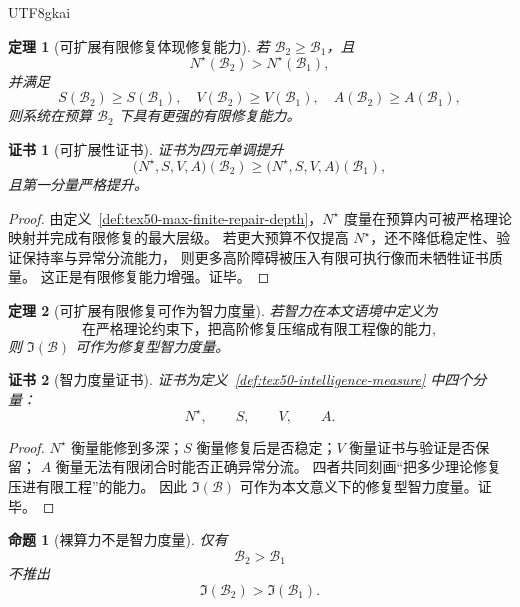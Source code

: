\documentclass[12pt]{article}
\newtheorem{theorem}{定理}[section]
\newtheorem{proposition}{命题}[section]
\newtheorem{Certificate}{证书}[section]
\begin{document}
\begin{CJK*}{UTF8}{gkai}
\begin{theorem}[可扩展有限修复体现修复能力]
\label{thm:tex50-scalable-finite-repair}
若 $\mathcal B_2\ge\mathcal B_1$，且
\[
  N^\star(\mathcal B_2)>N^\star(\mathcal B_1),
\]
并满足
\[
  S(\mathcal B_2)\ge S(\mathcal B_1),\quad
  V(\mathcal B_2)\ge V(\mathcal B_1),\quad
  A(\mathcal B_2)\ge A(\mathcal B_1),
\]
则系统在预算 $\mathcal B_2$ 下具有更强的有限修复能力。
\end{theorem}

\begin{Certificate}[可扩展性证书]
证书为四元单调提升
\[
  \bigl(
    N^\star,S,V,A
  \bigr)(\mathcal B_2)
  \ge
  \bigl(
    N^\star,S,V,A
  \bigr)(\mathcal B_1),
\]
且第一分量严格提升。
\end{Certificate}

\begin{proof}
由定义~\ref{def:tex50-max-finite-repair-depth}，$N^\star$ 度量在预算内可被严格理论映射并完成有限修复的最大层级。
若更大预算不仅提高 $N^\star$，还不降低稳定性、验证保持率与异常分流能力，
则更多高阶障碍被压入有限可执行像而未牺牲证书质量。
这正是有限修复能力增强。证毕。
\end{proof}

\begin{theorem}[可扩展有限修复可作为智力度量]
\label{thm:tex50-repair-intelligence}
若智力在本文语境中定义为
\[
  \text{在严格理论约束下，把高阶修复压缩成有限工程像的能力},
\]
则 $\mathfrak I(\mathcal B)$ 可作为修复型智力度量。
\end{theorem}

\begin{Certificate}[智力度量证书]
证书为定义~\ref{def:tex50-intelligence-measure} 中四个分量：
\[
  N^\star,\qquad S,\qquad V,\qquad A.
\]
\end{Certificate}

\begin{proof}
$N^\star$ 衡量能修到多深；$S$ 衡量修复后是否稳定；$V$ 衡量证书与验证是否保留；
$A$ 衡量无法有限闭合时能否正确异常分流。
四者共同刻画“把多少理论修复压进有限工程”的能力。
因此 $\mathfrak I(\mathcal B)$ 可作为本文意义下的修复型智力度量。证毕。
\end{proof}

\begin{proposition}[裸算力不是智力度量]
\label{prop:tex50-bare-compute-not-intelligence}
仅有
\[
  \mathcal B_2>\mathcal B_1
\]
不推出
\[
  \mathfrak I(\mathcal B_2)>\mathfrak I(\mathcal B_1).
\]
\end{proposition}


\end{CJK*}
\end{document}
